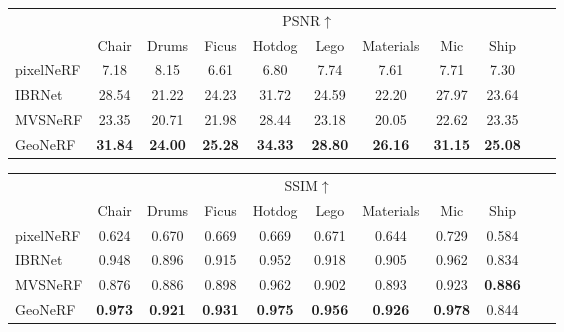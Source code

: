 \begin{table}[!t]
    \begin{center}
        \begin{threeparttable}
            \begin{tabular}{l|cccccccccc}
            & \multicolumn{8}{c}{PSNR$\uparrow$} \\
            &  Chair & Drums & Ficus & Hotdog & Lego & Materials & Mic & Ship \\
            \hline
            pixelNeRF & \phantom{0}7.18 & \phantom{0}8.15 & \phantom{0}6.61 & \phantom{0}6.80 & \phantom{0}7.74 & \phantom{0}7.61 & \phantom{0}7.71 & \phantom{0}7.30 \\
            IBRNet & 28.54 & 21.22 & 24.23 & 31.72 & 24.59 & 22.20 & 27.97 & 23.64 \\
            MVSNeRF & 23.35 & 20.71 & 21.98 & 28.44 & 23.18 & 20.05 & 22.62 & 23.35 \\
            GeoNeRF & \textbf{31.84} & \textbf{24.00} & \textbf{25.28} & \textbf{34.33} & \textbf{28.80} & \textbf{26.16} & \textbf{31.15} & \textbf{25.08} \\
            \hline
            \end{tabular}
        \end{threeparttable}
    \end{center}
    
    \vspace{1.0ex}

    \begin{center}
        \begin{threeparttable}
            \begin{tabular}{l|cccccccccc}
            & \multicolumn{8}{c}{SSIM$\uparrow$} \\
            &  Chair & Drums & Ficus & Hotdog & Lego & Materials & Mic & Ship \\
            \hline
            pixelNeRF & 0.624 & 0.670 & 0.669 & 0.669 & 0.671 & 0.644 & 0.729 & 0.584 \\
            IBRNet & 0.948 & 0.896 & 0.915 & 0.952 & 0.918 & 0.905 & 0.962 & 0.834 \\
            MVSNeRF & 0.876 & 0.886 & 0.898 & 0.962 & 0.902 & 0.893 & 0.923 & \textbf{0.886} \\
            GeoNeRF & \textbf{0.973} & \textbf{0.921} & \textbf{0.931} & \textbf{0.975} & \textbf{0.956} & \textbf{0.926} & \textbf{0.978} & 0.844 \\
            \hline
            \end{tabular}
        \end{threeparttable}
    \end{center}
    

\end{table}
